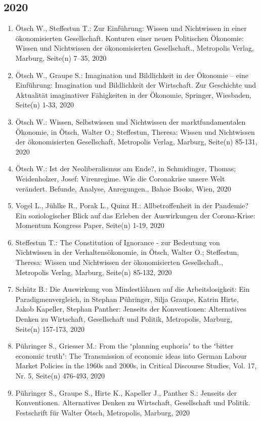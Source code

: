 \subsection*{2020}
\begin{enumerate}
    	 \item Ötsch W., Steffestun T.: Zur Einführung: Wissen und Nichtwissen in einer ökonomisierten Gesellschaft. Konturen einer neuen Politischen Ökonomie: Wissen und Nichtwissen der ökonomisierten Gesellschaft., Metropolis Verlag, Marburg, Seite(n) 7–35, 2020
	 \item Ötsch W., Graupe S.: Imagination und Bildlichkeit in der Ökonomie – eine Einführung: Imagination und Bildlichkeit der Wirtschaft. Zur Geschichte und Aktualität imaginativer Fähigkeiten in der Ökonomie, Springer, Wiesbaden, Seite(n) 1-33, 2020
	 \item Ötsch W.: Wissen, Selbstwissen und Nichtwissen der marktfundamentalen Ökonomie, in Ötsch, Walter O.; Steffestun, Theresa: Wissen und Nichtwissen der ökonomisierten Gesellschaft, Metropolis Verlag, Marburg, Seite(n) 85-131, 2020
	 \item Ötsch W.: Ist der Neoliberalismus am Ende?, in Schmidinger, Thomas; Weidenholzer, Josef: Virenregime. Wie die Coronakrise unsere Welt verändert. Befunde, Analyse, Anregungen., Bahoe Books, Wien, 2020
	 \item Vogel L., Jühlke R., Porak L., Quinz H.: Allbetroffenheit in der Pandemie? Ein soziologischer Blick auf das Erleben der Auswirkungen der Corona-Krise: Momentum Kongress Paper, Seite(n) 1-19, 2020
	 \item Steffestun T.: The Constitution of Ignorance - zur Bedeutung von Nichtwissen in der Verhaltensökonomie, in Ötsch, Walter O.; Steffestun, Theresa: Wissen und Nichtwissen der ökonomisierten Gesellschaft., Metropolis Verlag, Marburg, Seite(n) 85-132, 2020
	 \item Schütz B.: Die Auswirkung von Mindestlöhnen auf die Arbeitslosigkeit: Ein Paradigmenvergleich, in Stephan Pühringer, Silja Graupe, Katrin Hirte, Jakob Kapeller, Stephan Panther: Jenseits der Konventionen: Alternatives Denken zu Wirtschaft, Gesellschaft und Politik, Metropolis, Marburg, Seite(n) 157-173, 2020
	 \item Pühringer S., Griesser M.: From the ʻplanning euphoriaʼ to the ʻbitter economic truthʼ: The Transmission of economic ideas into German Labour Market Policies in the 1960s and 2000s, in Critical Discourse Studies, Vol. 17, Nr. 5, Seite(n) 476-493, 2020
	 \item Pühringer S., Graupe S., Hirte K., Kapeller J., Panther S.: Jenseits der Konventionen. Alternatives Denken zu Wirtschaft, Gesellschaft und Politik. Festschrift für Walter Ötsch, Metropolis, Marburg, 2020

\end{enumerate}
